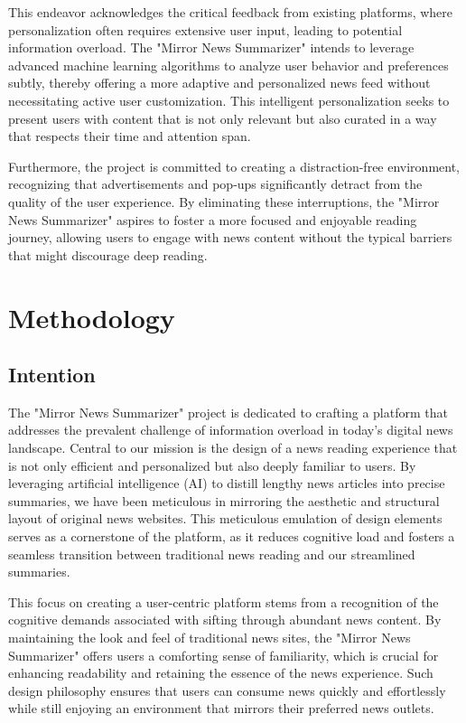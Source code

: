 \documentclass[10pt]{article}
\begin{document}
This endeavor acknowledges the critical feedback from existing platforms, where personalization often requires extensive user input, leading to potential information overload. The "Mirror News Summarizer" intends to leverage advanced machine learning algorithms to analyze user behavior and preferences subtly, thereby offering a more adaptive and personalized news feed without necessitating active user customization. This intelligent personalization seeks to present users with content that is not only relevant but also curated in a way that respects their time and attention span.

Furthermore, the project is committed to creating a distraction-free environment, recognizing that advertisements and pop-ups significantly detract from the quality of the user experience. By eliminating these interruptions, the "Mirror News Summarizer" aspires to foster a more focused and enjoyable reading journey, allowing users to engage with news content without the typical barriers that might discourage deep reading.

\newpage
\section{Methodology}

\subsection{Intention}
The "Mirror News Summarizer" project is dedicated to crafting a platform that addresses the prevalent challenge of information overload in today's digital news landscape. Central to our mission is the design of a news reading experience that is not only efficient and personalized but also deeply familiar to users. By leveraging artificial intelligence (AI) to distill lengthy news articles into precise summaries, we have been meticulous in mirroring the aesthetic and structural layout of original news websites. This meticulous emulation of design elements serves as a cornerstone of the platform, as it reduces cognitive load and fosters a seamless transition between traditional news reading and our streamlined summaries.

This focus on creating a user-centric platform stems from a recognition of the cognitive demands associated with sifting through abundant news content. By maintaining the look and feel of traditional news sites, the "Mirror News Summarizer" offers users a comforting sense of familiarity, which is crucial for enhancing readability and retaining the essence of the news experience. Such design philosophy ensures that users can consume news quickly and effortlessly while still enjoying an environment that mirrors their preferred news outlets.
\end{document}
